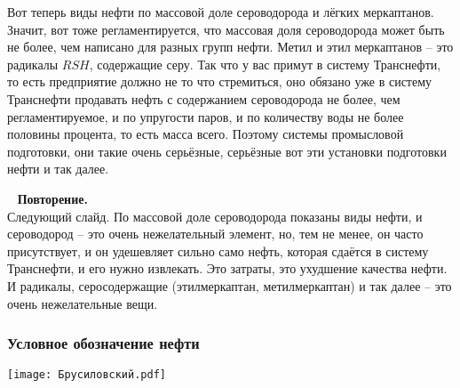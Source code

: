 \documentclass[main.tex]{subfiles}
\begin{document}
Вот теперь виды нефти по массовой доле сероводорода и лёгких меркаптанов.
Значит, вот тоже регламентируется, что массовая доля сероводорода может быть не более, чем написано для разных групп нефти.
Метил и этил меркаптанов -- это радикалы $RSH$, содержащие серу.
Так что у вас примут в систему Транснефти, то есть предприятие должно не то что стремиться, оно обязано уже в систему Транснефти продавать нефть с содержанием сероводорода не более, чем регламентируемое, и по упругости паров, и по количеству воды не более половины процента, то есть масса всего.
Поэтому системы промысловой подготовки, они такие очень серьёзные, серьёзные вот эти установки подготовки нефти и так далее.

\ \newline
\textbf{Повторение.}\\
Следующий слайд.
По массовой доле сероводорода показаны виды нефти, и сероводород -- это очень нежелательный элемент, но, тем не менее, он часто присутствует, и он удешевляет сильно само нефть, которая сдаётся в систему Транснефти, и его нужно извлекать.
Это затраты, это ухудшение качества нефти.
И радикалы, серосодержащие (этилмеркаптан, метилмеркаптан) и так далее -- это очень нежелательные вещи.

\subsubsection{Условное обозначение нефти}

\begin{center}
\texttt{[image: Брусиловский.pdf]}
\end{center}
\end{document}
